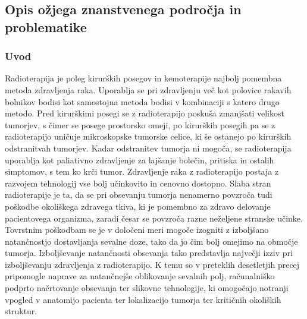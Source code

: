 \documentclass[a4paper,twoside,11pt]{article}
\begin{document}
	\subsection{Opis ožjega znanstvenega področja in problematike}
	\subsubsection*{Uvod}
	\par{
	  Radioterapija je poleg kirurških posegov in kemoterapije najbolj pomembna metoda zdravljenja raka. Uporablja se pri zdravljenju več kot polovice rakavih bolnikov bodisi kot samostojna metoda bodisi v kombinaciji s katero drugo metodo. Pred kirurškimi posegi se z radioterapijo poskuša zmanjšati velikost tumorjev, s čimer se posege prostorsko omeji, po kirurških posegih pa se z radioterapijo uničuje mikroskopske tumorske celice, ki še ostanejo po kirurških odstranitvah tumorjev. Kadar odstranitev tumorja ni mogoča, se radioterapija uporablja kot paliativno zdravljenje za lajšanje bolečin, pritiska in ostalih simptomov, s tem ko krči tumor. Zdravljenje raka z radioterapijo postaja z razvojem tehnologij vse bolj učinkovito in cenovno dostopno. Slaba stran radioterapije je ta, da se pri obsevanju tumorja nenamerno povzroča tudi poškodbe okoliškega zdravega tkiva, ki je pomembno za zdravo delovanje pacientovega organizma, zaradi česar se povzroča razne neželjene stranske učinke. Tovrstnim poškodbam se je v določeni meri mogoče izogniti z izboljšano natančnostjo dostavljanja sevalne doze, tako da jo čim bolj omejimo na območje tumorja. Izboljševanje natančnosti obsevanja tako predstavlja največji izziv pri izboljševanju zdravljenja z radioterapijo. K temu so v preteklih desetletjih precej pripomogle naprave za natančnejše oblikovanje sevalnih polj, računalniško podprto načrtovanje obsevanja ter slikovne tehnologije, ki omogočajo notranji vpogled v anatomijo pacienta ter lokalizacijo tumorja ter kritičnih okoliških struktur.
	} %
\end{document}
